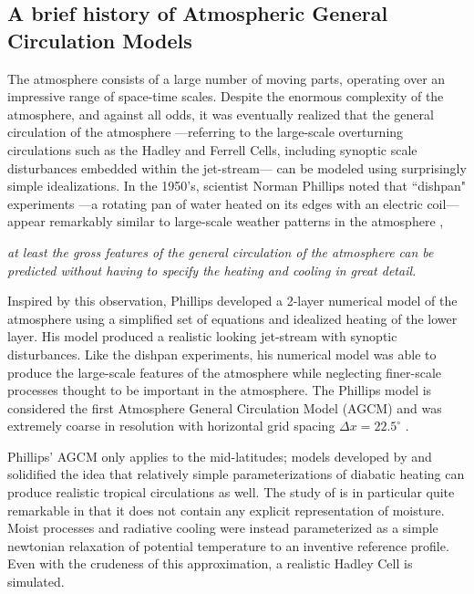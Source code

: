 \subsection{A brief history of Atmospheric General Circulation Models}

The atmosphere consists of a large number of moving parts, operating over an impressive range of space-time scales. Despite the enormous complexity of the atmosphere, and against all odds, it was eventually realized that the general circulation of the atmosphere ---referring to the large-scale overturning circulations such as the Hadley and Ferrell Cells, including synoptic scale disturbances embedded within the jet-stream--- can be modeled using surprisingly simple idealizations. In the 1950's, scientist Norman Phillips noted that  ``dishpan" experiments ---a rotating pan of water heated on its edges with an electric coil--- appear remarkably similar to large-scale weather patterns in the atmosphere \citep{WEART2008},
\begin{displayquote}
{\em{at least the gross features of the general circulation of the atmosphere can be predicted without having to specify the heating and cooling in great detail.}}
\end{displayquote}
Inspired by this observation, Phillips developed a 2-layer numerical model of the atmosphere using a simplified set of equations and idealized heating of the lower layer. His model produced a realistic looking jet-stream with synoptic disturbances. Like the dishpan experiments, his numerical model was able to produce the large-scale features of the atmosphere while neglecting finer-scale processes thought to be important in the atmosphere. The Phillips model is considered the first Atmosphere General Circulation Model (AGCM) and was extremely coarse in resolution with horizontal grid spacing $\Delta x = 22.5^{\circ}$ \citep{WEART2008}.

Phillips' AGCM only applies to the mid-latitudes; models developed by \cite{METAL1965MWR} and \cite{HH1980JAS} solidified the idea that relatively simple parameterizations of diabatic heating can produce realistic tropical circulations as well. The study of \cite{HH1980JAS} is in particular quite remarkable in that it does not contain any explicit representation of moisture. Moist processes and radiative cooling were instead parameterized as a simple newtonian relaxation of potential temperature to an inventive reference profile. Even with the crudeness of this approximation, a realistic Hadley Cell is simulated. 

